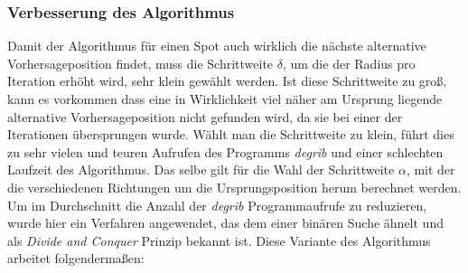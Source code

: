 \subsubsection{Verbesserung des Algorithmus}
Damit der Algorithmus für einen Spot auch wirklich die nächste
alternative Vorhersageposition findet, muss die Schrittweite $\delta$,
um die der Radius pro Iteration erhöht wird, sehr klein gewählt
werden. Ist diese Schrittweite zu groß, kann es vorkommen dass eine in
Wirklichkeit viel näher am Ursprung liegende alternative
Vorhersageposition nicht gefunden wird, da sie bei einer der
Iterationen übersprungen wurde. Wählt man die Schrittweite zu klein,
führt dies zu sehr vielen und teuren Aufrufen des Programms
\textit{degrib} und einer schlechten Laufzeit des Algorithmus. Das
selbe gilt für die Wahl der Schrittweite $\alpha$, mit der die
verschiedenen Richtungen um die Ursprungsposition herum berechnet
werden. Um im Durchschnitt die Anzahl der \textit{degrib}
Programmaufrufe zu reduzieren, wurde hier ein Verfahren angewendet,
das dem einer binären Suche ähnelt und als \textit{Divide and Conquer}
Prinzip bekannt ist. Diese Variante des Algorithmus arbeitet
folgendermaßen:

